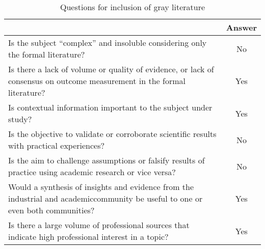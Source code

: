 \begin{table}
  \centering
  \caption{Questions for inclusion of gray literature}
  \label{tab:questoesgarousi}
  \footnotesize
  \begin{tabular}{p{12cm}|c}
    \bottomrule
    \rowcolor[rgb]{0.753,0.753,0.753} \multicolumn{1}{c|}{\textbf{Question}}                                                                    & \textbf{Answer} \\
    \hline
    \rowcolor[rgb]{0.898,0.898,0.898} Is the subject “complex” and insoluble considering only the formal literature?                            & No              \\
    Is there a lack of volume or quality of evidence, or lack of consensus on outcome measurement in the formal literature?                     & Yes             \\
    \rowcolor[rgb]{0.898,0.898,0.898} Is contextual information important to the subject under study?                                           & Yes             \\
    Is the objective to validate or corroborate scientific results with practical experiences?                                                  & No              \\
    \rowcolor[rgb]{0.898,0.898,0.898} Is the aim to challenge assumptions or falsify results of practice using academic research or vice versa? & No              \\
    Would a synthesis of insights and evidence from the industrial and academiccommunity be useful to one or even both communities?             & Yes             \\
    \rowcolor[rgb]{0.898,0.898,0.898} Is there a large volume of professional sources that indicate high professional interest in a topic?      & Yes             \\
    \toprule
  \end{tabular}
\end{table}